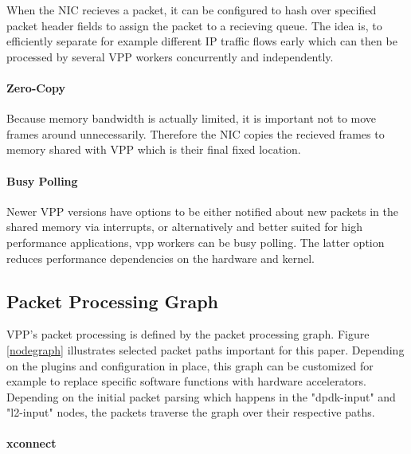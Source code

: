 When the NIC recieves a packet, it can be configured to hash over
specified packet header fields to assign the packet to a recieving
queue. The idea is, to efficiently separate for example different IP
traffic flows early which can then be processed by several VPP workers
concurrently and independently. \cite{linguaglossa2017high}

\paragraph{Zero-Copy}

Because memory bandwidth is actually limited, it is important not to
move frames around unnecessarily. Therefore the NIC copies the
recieved frames to memory shared with VPP which is their final fixed
location. \cite{linguaglossa2017high}

\paragraph{Busy Polling}

Newer VPP versions have options to be either notified about new
packets in the shared memory via interrupts, or alternatively and
better suited for high performance applications, vpp workers can be
busy polling. The latter option reduces performance dependencies on
the hardware and kernel. \cite{vppdocs:rxmodes}


\subsection{Packet Processing Graph}


VPP's packet processing is defined by the packet processing graph.
Figure \ref{nodegraph} illustrates selected packet paths important for
this paper. Depending on the plugins and configuration in place, this
graph can be customized for example to replace specific software
functions with hardware accelerators. Depending on the initial packet
parsing which happens in the "dpdk-input" and "l2-input" nodes, the
packets traverse the graph over their respective paths.

\paragraph{xconnect}

